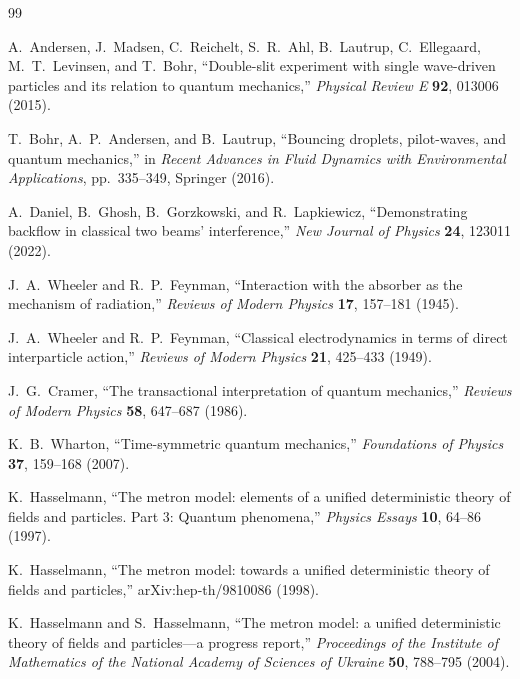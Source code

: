 \documentclass[11pt]{article}
\begin{document}
\begin{thebibliography}{99}

A.~Andersen, J.~Madsen, C.~Reichelt, S.~R.~Ahl, B.~Lautrup, C.~Ellegaard, M.~T.~Levinsen, and T.~Bohr,
``Double-slit experiment with single wave-driven particles and its relation to quantum mechanics,''
\emph{Physical Review E} \textbf{92}, 013006 (2015).

T.~Bohr, A.~P.~Andersen, and B.~Lautrup,
``Bouncing droplets, pilot-waves, and quantum mechanics,''
in \emph{Recent Advances in Fluid Dynamics with Environmental Applications}, pp.~335--349, Springer (2016).

A.~Daniel, B.~Ghosh, B.~Gorzkowski, and R.~Lapkiewicz,
``Demonstrating backflow in classical two beams' interference,''
\emph{New Journal of Physics} \textbf{24}, 123011 (2022).

J.~A.~Wheeler and R.~P.~Feynman,
``Interaction with the absorber as the mechanism of radiation,''
\emph{Reviews of Modern Physics} \textbf{17}, 157--181 (1945).

J.~A.~Wheeler and R.~P.~Feynman,
``Classical electrodynamics in terms of direct interparticle action,''
\emph{Reviews of Modern Physics} \textbf{21}, 425--433 (1949).

J.~G.~Cramer,
``The transactional interpretation of quantum mechanics,''
\emph{Reviews of Modern Physics} \textbf{58}, 647--687 (1986).

K.~B.~Wharton,
``Time-symmetric quantum mechanics,''
\emph{Foundations of Physics} \textbf{37}, 159--168 (2007).

K.~Hasselmann,
``The metron model: elements of a unified deterministic theory of fields and particles. Part 3: Quantum phenomena,''
\emph{Physics Essays} \textbf{10}, 64--86 (1997).

K.~Hasselmann,
``The metron model: towards a unified deterministic theory of fields and particles,''
arXiv:hep-th/9810086 (1998).

K.~Hasselmann and S.~Hasselmann,
``The metron model: a unified deterministic theory of fields and particles---a progress report,''
\emph{Proceedings of the Institute of Mathematics of the National Academy of Sciences of Ukraine} \textbf{50}, 788--795 (2004).

\end{thebibliography}
\end{document}
